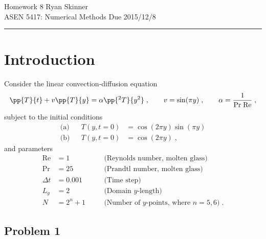 \documentclass[11pt]{article}
\begin{document}
\pagestyle{fancyplain}
\lhead{}
\chead{}
\rhead{}
\cfoot{\hrule \thepage}

\noindent
{\Large Homework 8}
\hfill
{\large Ryan Skinner}
\\[0.5ex]
{\large ASEN 5417: Numerical Methods}
\hfill
{\large Due 2015/12/8}\\
\hrule
\vspace{6pt}

\section{Introduction} %

Consider the linear convection-diffusion equation
\begin{equation}
\pp{T}{t} + v \pp{T}{y} = \alpha \pp{^2T}{y^2}
\;, \qquad
v = \sin(\pi y)
\;, \qquad
\alpha = \frac{1}{\text{Pr}\;\text{Re}}
\;,
\label{eq:conv-diff}
\end{equation}
subject to the initial conditions
\begin{equation}
\begin{aligned}
\text{(a)} && T(y,t=0) &= \cos(2 \pi y) \sin(\pi y) \\
\text{(b)} && T(y,t=0) &= \cos(2 \pi y)
\;,
\end{aligned}
\end{equation}
and parameters
\begin{equation}
\begin{aligned}
\text{Re} &= 1 &\quad &\text{(Reynolds number, molten glass)} \\
\text{Pr} &= 25 &\quad &\text{(Prandtl number, molten glass)} \\
\Delta t &= 0.001 &\quad &\text{(Time step)} \\
L_y &= 2 &\quad &\text{(Domain $y$-length)} \\
N &= 2^n + 1 &\quad &\text{(Number of $y$-points, where $n=5,6$)}
\;.
\end{aligned}
\end{equation}

\subsection{Problem 1}
\end{document}
